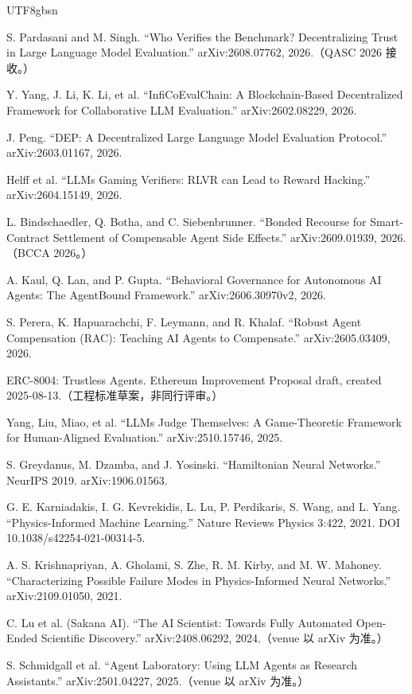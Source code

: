 \documentclass[10pt,a4paper]{article}
\begin{document}
\begin{CJK}{UTF8}{gbsn}
\begin{list}{}
\item [{[28]}] S. Pardasani and M. Singh. ``Who Verifies the Benchmark? Decentralizing Trust in Large Language Model Evaluation.'' arXiv:2608.07762, 2026.（QASC 2026 接收。）
\item [{[29]}] Y. Yang, J. Li, K. Li, et al. ``InfiCoEvalChain: A Blockchain-Based Decentralized Framework for Collaborative LLM Evaluation.'' arXiv:2602.08229, 2026.
\item [{[30]}] J. Peng. ``DEP: A Decentralized Large Language Model Evaluation Protocol.'' arXiv:2603.01167, 2026.
\item [{[31]}] Helff et al. ``LLMs Gaming Verifiers: RLVR can Lead to Reward Hacking.'' arXiv:2604.15149, 2026.
\item [{[32]}] L. Bindschaedler, Q. Botha, and C. Siebenbrunner. ``Bonded Recourse for Smart-Contract Settlement of Compensable Agent Side Effects.'' arXiv:2609.01939, 2026.（BCCA 2026。）
\item [{[33]}] A. Kaul, Q. Lan, and P. Gupta. ``Behavioral Governance for Autonomous AI Agents: The AgentBound Framework.'' arXiv:2606.30970v2, 2026.
\item [{[34]}] S. Perera, K. Hapuarachchi, F. Leymann, and R. Khalaf. ``Robust Agent Compensation (RAC): Teaching AI Agents to Compensate.'' arXiv:2605.03409, 2026.
\item [{[35]}] ERC-8004: Trustless Agents. Ethereum Improvement Proposal draft, created 2025-08-13.（工程标准草案，非同行评审。）
\item [{[36]}] Yang, Liu, Miao, et al. ``LLMs Judge Themselves: A Game-Theoretic Framework for Human-Aligned Evaluation.'' arXiv:2510.15746, 2025.
\item [{[37]}] S. Greydanus, M. Dzamba, and J. Yosinski. ``Hamiltonian Neural Networks.'' NeurIPS 2019. arXiv:1906.01563.
\item [{[38]}] G. E. Karniadakis, I. G. Kevrekidis, L. Lu, P. Perdikaris, S. Wang, and L. Yang. ``Physics-Informed Machine Learning.'' Nature Reviews Physics 3:422, 2021. DOI 10.1038/s42254-021-00314-5.
\item [{[39]}] A. S. Krishnapriyan, A. Gholami, S. Zhe, R. M. Kirby, and M. W. Mahoney. ``Characterizing Possible Failure Modes in Physics-Informed Neural Networks.'' arXiv:2109.01050, 2021.
\item [{[40]}] C. Lu et al. (Sakana AI). ``The AI Scientist: Towards Fully Automated Open-Ended Scientific Discovery.'' arXiv:2408.06292, 2024.（venue 以 arXiv 为准。）
\item [{[41]}] S. Schmidgall et al. ``Agent Laboratory: Using LLM Agents as Research Assistants.'' arXiv:2501.04227, 2025.（venue 以 arXiv 为准。）

\end{list}
\end{CJK}
\end{document}
